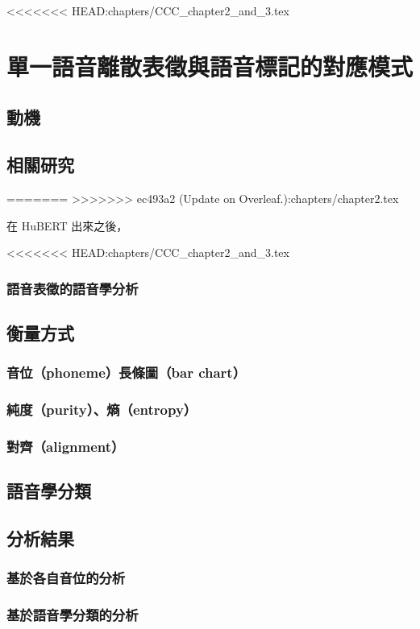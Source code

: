 <<<<<<< HEAD:chapters/CCC_chapter2_and_3.tex
\chapter{
    單一語音離散表徵與語音標記的對應模式}
\section{動機}  %
\section{相關研究}
=======
>>>>>>> ec493a2 (Update on Overleaf.):chapters/chapter2.tex

在 HuBERT 出來之後，

<<<<<<< HEAD:chapters/CCC_chapter2_and_3.tex
\subsection{語音表徵的語音學分析}
\section{衡量方式}
\subsection{音位（phoneme）長條圖（bar chart）}
\subsection{純度（purity）、熵（entropy）}
\subsection{對齊（alignment）}
\section{語音學分類}
\section{分析結果}
\subsection{基於各自音位的分析}
\subsection{基於語音學分類的分析}
